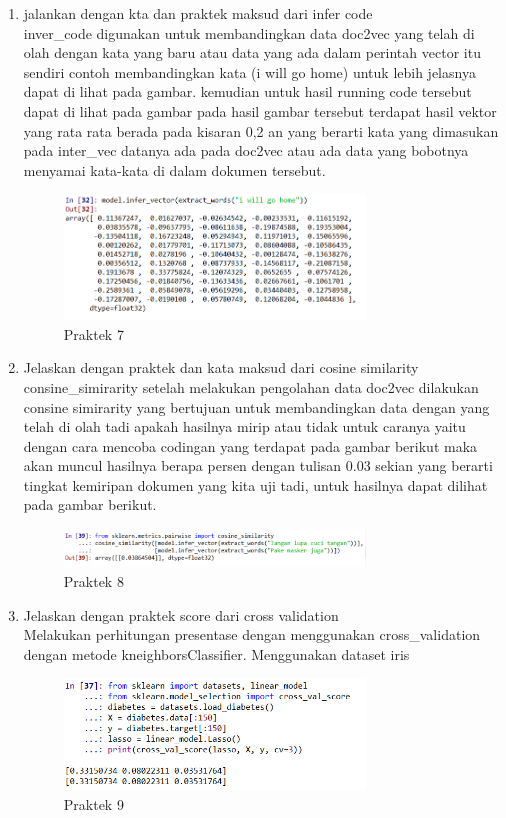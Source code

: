 \begin{enumerate}
\item jalankan dengan kta dan praktek maksud dari infer code
	\hfill\\
	inver\_code digunakan untuk membandingkan data doc2vec yang telah di olah dengan kata yang baru atau data yang ada dalam perintah vector itu sendiri contoh membandingkan kata (i will go home) untuk lebih jelasnya dapat di lihat pada gambar. kemudian untuk hasil running code tersebut dapat di lihat pada gambar pada hasil gambar tersebut terdapat hasil vektor yang rata rata berada pada kisaran 0,2 an yang berarti kata yang dimasukan pada inter\_vec datanya ada pada doc2vec atau ada data yang bobotnya menyamai kata-kata di dalam dokumen tersebut.
\begin{figure}[H]
    \includegraphics[width=8cm]{figures/1174084/5/19.png}
    \centering
    \caption{Praktek 7}
\end{figure}

\item  Jelaskan dengan praktek dan kata maksud dari cosine similarity
	\hfill\\
	consine\_simirarity setelah melakukan pengolahan data doc2vec dilakukan consine simirarity yang bertujuan untuk membandingkan data dengan yang telah di olah tadi apakah hasilnya mirip atau tidak untuk caranya yaitu dengan cara mencoba codingan yang terdapat pada gambar berikut maka akan muncul hasilnya berapa persen dengan tulisan 0.03 sekian yang berarti tingkat kemiripan dokumen yang kita uji tadi, untuk hasilnya dapat dilihat pada gambar berikut.
	
\begin{figure}[H]
    \includegraphics[width=8cm]{figures/1174084/5/20.png}
    \centering
    \caption{Praktek 8}
\end{figure}

\item  Jelaskan dengan praktek score dari cross validation
	\hfill\\
	Melakukan perhitungan presentase dengan menggunakan cross\_validation dengan metode kneighborsClassifier. Menggunakan dataset iris
	\begin{figure}[H]
    \includegraphics[width=8cm]{figures/1174084/5/21.png}
    \centering
    \caption{Praktek 9}
\end{figure}
\end{enumerate}

